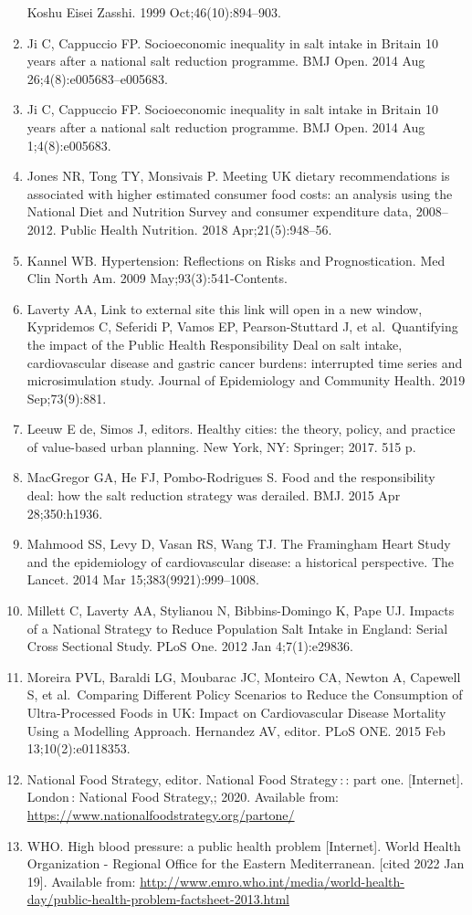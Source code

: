 \documentclass[
]{article}
\begin{document}
\begin{enumerate}
  Koshu Eisei Zasshi. 1999 Oct;46(10):894--903.
\item
  Ji C, Cappuccio FP. Socioeconomic inequality in salt intake in Britain
  10 years after a national salt reduction programme. BMJ Open. 2014 Aug
  26;4(8):e005683--e005683.
\item
  Ji C, Cappuccio FP. Socioeconomic inequality in salt intake in Britain
  10 years after a national salt reduction programme. BMJ Open. 2014 Aug
  1;4(8):e005683.
\item
  Jones NR, Tong TY, Monsivais P. Meeting UK dietary recommendations is
  associated with higher estimated consumer food costs: an analysis
  using the National Diet and Nutrition Survey and consumer expenditure
  data, 2008--2012. Public Health Nutrition. 2018 Apr;21(5):948--56.
\item
  Kannel WB. Hypertension: Reflections on Risks and Prognostication. Med
  Clin North Am. 2009 May;93(3):541-Contents.
\item
  Laverty AA, Link to external site this link will open in a new window,
  Kypridemos C, Seferidi P, Vamos EP, Pearson-Stuttard J, et
  al.~Quantifying the impact of the Public Health Responsibility Deal on
  salt intake, cardiovascular disease and gastric cancer burdens:
  interrupted time series and microsimulation study. Journal of
  Epidemiology and Community Health. 2019 Sep;73(9):881.
\item
  Leeuw E de, Simos J, editors. Healthy cities: the theory, policy, and
  practice of value-based urban planning. New York, NY: Springer; 2017.
  515 p.
\item
  MacGregor GA, He FJ, Pombo-Rodrigues S. Food and the responsibility
  deal: how the salt reduction strategy was derailed. BMJ. 2015 Apr
  28;350:h1936.
\item
  Mahmood SS, Levy D, Vasan RS, Wang TJ. The Framingham Heart Study and
  the epidemiology of cardiovascular disease: a historical perspective.
  The Lancet. 2014 Mar 15;383(9921):999--1008.
\item
  Millett C, Laverty AA, Stylianou N, Bibbins-Domingo K, Pape UJ.
  Impacts of a National Strategy to Reduce Population Salt Intake in
  England: Serial Cross Sectional Study. PLoS One. 2012 Jan
  4;7(1):e29836.
\item
  Moreira PVL, Baraldi LG, Moubarac JC, Monteiro CA, Newton A, Capewell
  S, et al.~Comparing Different Policy Scenarios to Reduce the
  Consumption of Ultra-Processed Foods in UK: Impact on Cardiovascular
  Disease Mortality Using a Modelling Approach. Hernandez AV, editor.
  PLoS ONE. 2015 Feb 13;10(2):e0118353.
\item
  National Food Strategy, editor. National Food Strategy\,:\,: part one.
  {[}Internet{]}. London\,: National Food Strategy,; 2020. Available
  from: \url{https://www.nationalfoodstrategy.org/partone/}
\item
  WHO. High blood pressure: a public health problem {[}Internet{]}.
  World Health Organization - Regional Office for the Eastern
  Mediterranean. {[}cited 2022 Jan 19{]}. Available from:
  \url{http://www.emro.who.int/media/world-health-day/public-health-problem-factsheet-2013.html}
\end{enumerate}
\end{document}
